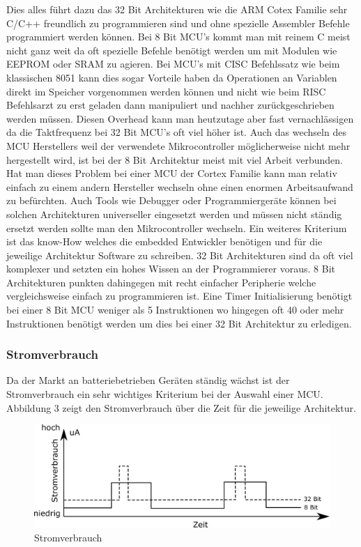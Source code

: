 \documentclass[MES,Master,ngerman]{twbook}%
\begin{document}
Dies alles führt dazu das 32 Bit Architekturen wie die ARM Cotex Familie sehr C/C++ freundlich zu programmieren sind und ohne spezielle Assembler Befehle programmiert werden können. Bei 8 Bit MCU's kommt man mit reinem C meist nicht ganz weit da oft spezielle Befehle benötigt werden um mit Modulen wie EEPROM oder SRAM zu agieren. Bei MCU's mit CISC Befehlssatz wie beim klassischen 8051 kann dies sogar Vorteile haben da Operationen an Variablen direkt im Speicher vorgenommen werden können und nicht wie beim RISC Befehlsarzt zu erst geladen dann manipuliert und nachher zurückgeschrieben werden müssen. Diesen Overhead kann man heutzutage aber fast vernachlässigen da die Taktfrequenz bei 32 Bit MCU's oft viel höher ist. Auch das wechseln des MCU Herstellers weil der verwendete Mikrocontroller möglicherweise nicht mehr hergestellt wird, ist bei der 8 Bit Architektur meist mit viel Arbeit verbunden. Hat man dieses Problem bei einer MCU der Cortex Familie kann man relativ einfach zu einem andern Hersteller wechseln ohne einen enormen Arbeitsaufwand zu befürchten. Auch Tools wie Debugger oder Programmiergeräte können bei solchen Architekturen universeller eingesetzt werden und müssen nicht ständig ersetzt werden sollte man den Mikrocontroller wechseln. Ein weiteres Kriterium ist das know-How welches die embedded Entwickler benötigen und für die jeweilige Architektur Software zu schreiben. 32 Bit Architekturen sind da oft viel komplexer und setzten ein hohes Wissen an der Programmierer voraus. 8 Bit Architekturen punkten dahingegen mit recht einfacher Peripherie welche vergleichsweise einfach zu programmieren ist. Eine Timer Initialisierung benötigt bei einer 8 Bit MCU weniger als 5 Instruktionen wo hingegen oft 40 oder mehr Instruktionen benötigt werden um dies bei einer 32 Bit Architektur zu erledigen.

\subsubsection{Stromverbrauch}
Da der Markt an batteriebetrieben Geräten ständig wächst ist der Stromverbrauch ein sehr wichtiges Kriterium bei der Auswahl einer MCU. Abbildung 3 zeigt den Stromverbrauch über die Zeit für die jeweilige Architektur.

\begin{figure}[h]
	\centering
	\includegraphics[scale=1.3]{../Grafiken/power_consumption.png}
	\caption{Stromverbrauch}
	\label{fig:3_4}
\end{figure}
\end{document}
